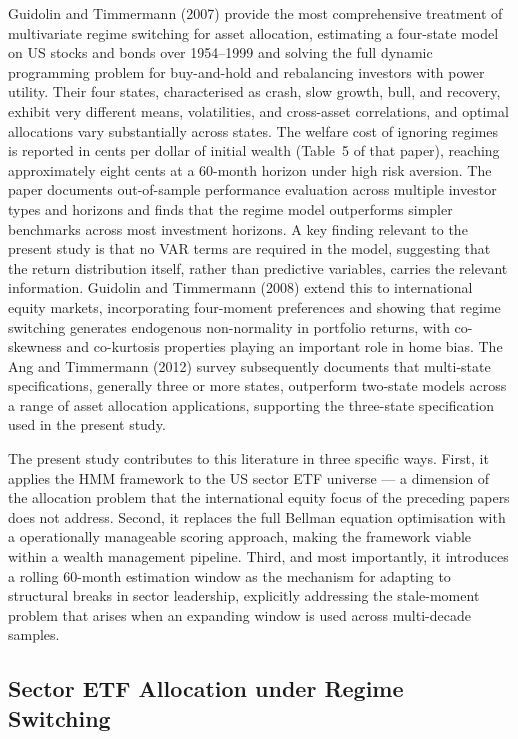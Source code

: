 \documentclass[12pt, a4paper]{article}
\begin{document}
Guidolin and Timmermann (2007) provide the most comprehensive treatment of multivariate
regime switching for asset allocation, estimating a four-state model on US stocks and bonds
over 1954--1999 and solving the full dynamic programming problem for buy-and-hold and
rebalancing investors with power utility. Their four states, characterised as crash, slow
growth, bull, and recovery, exhibit very different means, volatilities, and cross-asset
correlations, and optimal allocations vary substantially across states. The welfare cost of
ignoring regimes is reported in cents per dollar of initial wealth (Table~5 of that paper),
reaching approximately eight cents at a 60-month horizon under high risk aversion. The paper
documents out-of-sample performance evaluation across multiple investor types and horizons
and finds that the regime model outperforms simpler benchmarks across most investment horizons.
A key finding relevant to the present study is that no VAR terms are required in the model,
suggesting that the return distribution itself, rather than predictive variables, carries the
relevant information. Guidolin and Timmermann (2008) extend this to international equity
markets, incorporating four-moment preferences and showing that regime switching generates
endogenous non-normality in portfolio returns, with co-skewness and co-kurtosis properties
playing an important role in home bias. The Ang and Timmermann (2012) survey subsequently
documents that multi-state specifications, generally three or more states, outperform two-state
models across a range of asset allocation applications, supporting the three-state specification
used in the present study.

The present study contributes to this literature in three specific ways. First, it applies the
HMM framework to the US sector ETF universe --- a dimension of the allocation problem that the
international equity focus of the preceding papers does not address. Second, it replaces the
full Bellman equation optimisation with a operationally manageable scoring approach, making the framework viable within a wealth management pipeline. Third, and most importantly,
it introduces a rolling 60-month estimation window as the mechanism for adapting to structural
breaks in sector leadership, explicitly addressing the stale-moment problem that arises when
an expanding window is used across multi-decade samples.

\subsection{Sector ETF Allocation under Regime Switching}
\end{document}
